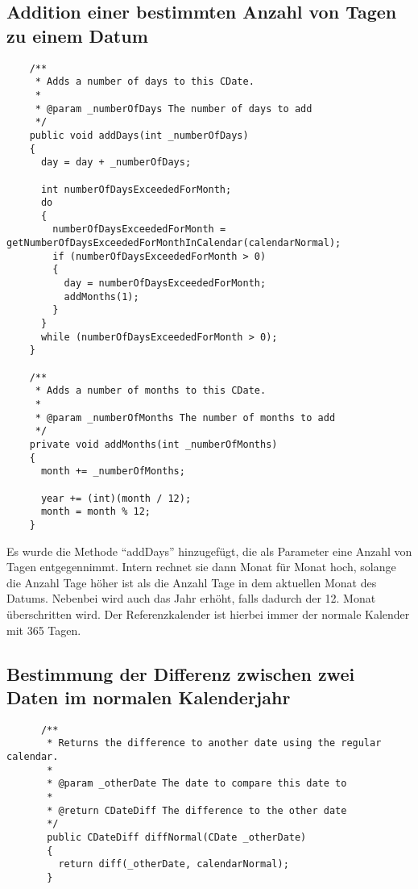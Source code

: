 \documentclass[12pt,pdftex,parskip=half]{scrartcl}
\begin{document}
  \clearpage


  \subsection{Addition einer bestimmten Anzahl von Tagen zu einem Datum}

  \begin{lstlisting}
    /**
     * Adds a number of days to this CDate.
     *
     * @param _numberOfDays The number of days to add
     */
    public void addDays(int _numberOfDays)
    {
      day = day + _numberOfDays;

      int numberOfDaysExceededForMonth;
      do
      {
        numberOfDaysExceededForMonth = getNumberOfDaysExceededForMonthInCalendar(calendarNormal);
        if (numberOfDaysExceededForMonth > 0)
        {
          day = numberOfDaysExceededForMonth;
          addMonths(1);
        }
      }
      while (numberOfDaysExceededForMonth > 0);
    }

    /**
     * Adds a number of months to this CDate.
     *
     * @param _numberOfMonths The number of months to add
     */
    private void addMonths(int _numberOfMonths)
    {
      month += _numberOfMonths;

      year += (int)(month / 12);
      month = month % 12;
    }
  \end{lstlisting}


  Es wurde die Methode "`addDays"' hinzugefügt, die als Parameter eine Anzahl von Tagen entgegennimmt.
  Intern rechnet sie dann Monat für Monat hoch, solange die Anzahl Tage höher ist als die Anzahl Tage in dem aktuellen Monat des Datums. Nebenbei wird auch das Jahr erhöht, falls dadurch der 12. Monat überschritten wird.
  Der Referenzkalender ist hierbei immer der normale Kalender mit 365 Tagen.

  \clearpage


  \subsection{Bestimmung der Differenz zwischen zwei Daten im normalen Kalenderjahr}

  \begin{lstlisting}
      /**
       * Returns the difference to another date using the regular calendar.
       *
       * @param _otherDate The date to compare this date to
       *
       * @return CDateDiff The difference to the other date
       */
       public CDateDiff diffNormal(CDate _otherDate)
       {
         return diff(_otherDate, calendarNormal);
       }
  \end{lstlisting}
\end{document}

